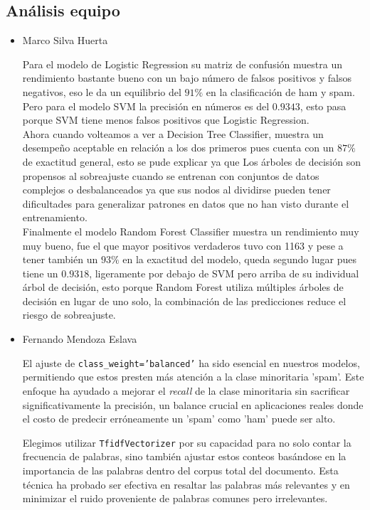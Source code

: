 \subsection{Análisis equipo}

\begin{itemize}
    \item Marco Silva Huerta 
    
    Para el modelo de Logistic Regression su matriz de confusión muestra un rendimiento bastante bueno con un bajo número de 
    falsos positivos y falsos negativos, eso le da un equilibrio del $91\%$ en la clasificación de ham y spam. Pero para el 
    modelo SVM la precisión en números es del $0.9343$, esto pasa porque SVM tiene menos falsos positivos que Logistic Regression.\\ 

    Ahora cuando volteamos a ver a Decision Tree Classifier, muestra un desempeño aceptable en relación a los dos primeros 
    pues cuenta  con un $87\%$ de exactitud general, esto se pude explicar ya que Los árboles de decisión son propensos al 
    sobreajuste cuando se entrenan con conjuntos de datos complejos o desbalanceados ya que sus nodos al dividirse pueden 
    tener dificultades para  generalizar patrones en datos que no han visto durante el entrenamiento.\\ 

    Finalmente el modelo Random Forest Classifier muestra un rendimiento muy muy bueno, fue el que mayor positivos verdaderos tuvo 
    con 1163 y pese a tener también un $93\%$ en la exactitud del modelo, queda segundo lugar pues tiene un $0.9318$, ligeramente 
    por debajo de SVM pero arriba de su individual árbol de decisión, esto porque Random Forest utiliza múltiples árboles de decisión 
    en lugar de uno solo, la combinación de las predicciones reduce el riesgo de sobreajuste.\\ 

    \item Fernando Mendoza Eslava

    El ajuste de \texttt{class\_weight='balanced'} ha sido esencial en nuestros modelos, permitiendo que estos presten más atención a la clase 
    minoritaria 'spam'. Este enfoque ha ayudado a mejorar el \textit{recall} de la clase minoritaria sin sacrificar significativamente la precisión, 
    un balance crucial en aplicaciones reales donde el costo de predecir erróneamente un 'spam' como 'ham' puede ser alto.
    
    Elegimos utilizar \texttt{TfidfVectorizer} por su capacidad para no solo contar la frecuencia de palabras, sino también ajustar estos conteos 
    basándose en la importancia de las palabras dentro del corpus total del documento. Esta técnica ha probado ser efectiva en resaltar 
    las palabras más relevantes y en minimizar el ruido proveniente de palabras comunes pero irrelevantes.
    

\end{itemize}
